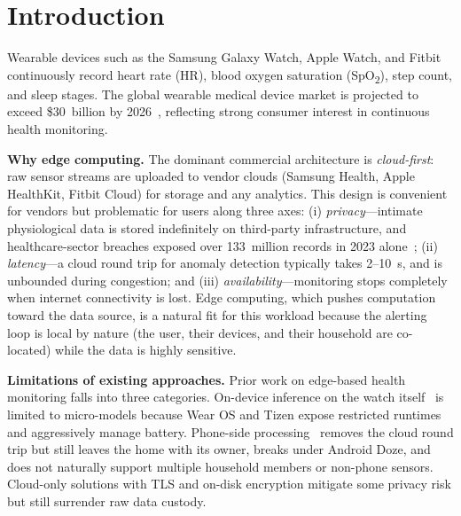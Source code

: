 \documentclass[conference]{IEEEtran}
\begin{document}
\section{Introduction}

Wearable devices such as the Samsung Galaxy Watch, Apple Watch, and Fitbit continuously record heart rate (HR), blood oxygen saturation (SpO\textsubscript{2}), step count, and sleep stages. The global wearable medical device market is projected to exceed \$30~billion by 2026~\cite{wearable_market}, reflecting strong consumer interest in continuous health monitoring.

\textbf{Why edge computing.} The dominant commercial architecture is \textit{cloud-first}: raw sensor streams are uploaded to vendor clouds (Samsung Health, Apple HealthKit, Fitbit Cloud) for storage and any analytics. This design is convenient for vendors but problematic for users along three axes: (i) \textit{privacy}---intimate physiological data is stored indefinitely on third-party infrastructure, and healthcare-sector breaches exposed over 133~million records in 2023 alone~\cite{hipaa_breaches}; (ii) \textit{latency}---a cloud round trip for anomaly detection typically takes 2--10~s, and is unbounded during congestion; and (iii) \textit{availability}---monitoring stops completely when internet connectivity is lost. Edge computing, which pushes computation toward the data source, is a natural fit for this workload because the alerting loop is local by nature (the user, their devices, and their household are co-located) while the data is highly sensitive.

\textbf{Limitations of existing approaches.} Prior work on edge-based health monitoring falls into three categories. On-device inference on the watch itself~\cite{wearos_onbody} is limited to micro-models because Wear OS and Tizen expose restricted runtimes and aggressively manage battery. Phone-side processing~\cite{phone_health} removes the cloud round trip but still leaves the home with its owner, breaks under Android Doze, and does not naturally support multiple household members or non-phone sensors. Cloud-only solutions with TLS and on-disk encryption mitigate some privacy risk but still surrender raw data custody.
\end{document}
